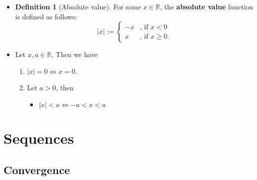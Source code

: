 \documentclass{article}
\newcommand{\R}{\mathbb{R}}
\newcommand{\?}{\stackrel{?}{=}}
\newcommand{\smallblacksquare}{\rule{0.5em}{0.5em}}
\theoremstyle{definition} %
\newtheorem{definition}[theorem]{Definition} %
\begin{document}
\begin{itemize}
    \item[]
          \begin{definition}[Absolute value]
              For some $x \in \R$, the \textbf{absolute value} function is defined as follows:
              \[ |x| := \begin{cases}
                      -x & \text{, if } x < 0     \\
                      x  & \text{, if } x \geq 0.
                  \end{cases} \]
          \end{definition}
    \item[]
          \begin{proposition}
              Let $x, a \in \R$. Then we have
              \begin{enumerate}[label=(\roman*)]
                  \item $|x| = 0 \iff x = 0$.
                  \item Let $a > 0$, then
                        \begin{itemize}[label=\smallblacksquare]
                            \item $|x| < a \iff -a < x < a$
                        \end{itemize}
              \end{enumerate}
          \end{proposition}
\end{itemize}

\section{Sequences}

\subsection{Convergence}
\end{document}
